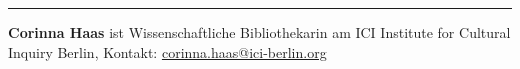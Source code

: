 \begin{center}\rule{0.5\linewidth}{\linethickness}\end{center}

\textbf{Corinna Haas} ist Wissenschaftliche Bibliothekarin am ICI
Institute for Cultural Inquiry Berlin, Kontakt:
\url{corinna.haas@ici-berlin.org}

